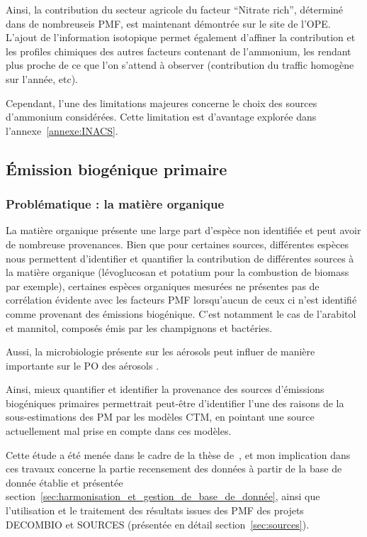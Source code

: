 Ainsi, la contribution du secteur agricole du facteur ``Nitrate rich'', déterminé dans de
nombreuseis PMF, est maintenant démontrée sur le site de l'OPE.
L'ajout de l'information isotopique permet également d'affiner la contribution et les
profiles chimiques des autres facteurs contenant de l'ammonium, les rendant plus proche de
ce que l'on s'attend à observer (contribution du traffic homogène sur l'année, etc).

Cependant, l'une des limitations majeures concerne le choix des sources d'ammonium
considérées. Cette limitation est d'avantage explorée dans l'annexe~\ref{annexe:INACS}.


\subsection{Émission biogénique primaire}%
\label{sub:émission_biogénique_primaire}

\subsubsection{Problématique : la matière organique}%
\label{ssub:problématique_la_matière_organique}

La matière organique présente une large part d'espèce non identifiée et peut avoir de
nombreuse provenances. Bien que pour certaines sources, différentes espèces nous
permettent d'identifier et quantifier la contribution de différentes sources à la matière
organique (lévoglucosan et potatium pour la combustion de biomass par exemple), certaines
espèces organiques mesurées ne présentes pas de corrélation évidente avec les facteurs PMF
lorsqu'aucun de ceux ci n'est identifié comme provenant des émissions biogénique. C'est
notamment le cas de l'arabitol et mannitol, composés émis par les champignons et
bactéries.

Aussi, la microbiologie présente sur les aérosols peut influer de manière importante
sur le PO des aérosols \autocite{samakeUnexpected2017}.

Ainsi, mieux quantifier et identifier la provenance des sources d'émissions biogéniques
primaires permettrait peut-être d'identifier l'une des raisons de la sous-estimations des
PM par les modèles CTM, en pointant une source actuellement mal prise en compte dans ces
modèles.

\begin{tcolorbox}[colback=red!5!white,colframe=Melon,title=Note]
    Cette étude a été menée dans le cadre de la thèse de~\cite{samakeAtmospheric2019}, et
    mon implication dans ces travaux concerne la partie recensement des données à partir
    de la base de donnée établie et présentée
    section~\ref{sec:harmonisation_et_gestion_de_base_de_donnée}, ainsi que l'utilisation
    et le traitement des résultats issues des PMF des projets DECOMBIO et SOURCES
    (présentée en détail section~\ref{sec:sources}).
\end{tcolorbox}

